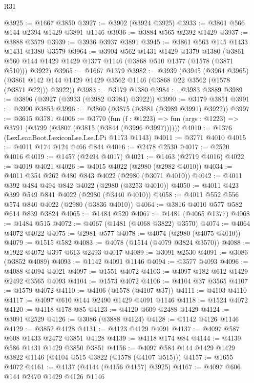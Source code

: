 \begin{lexlean}{R31}
\begin{coremodule}
@3925 := @1667 @3850
@3927 := @3902 (@3924 @3925)
@3933 := @3861 @566 @144 @2394 @1429 @3891 @1146
@3936 := @3884 @565 @2392 @1429
@3937 := @3888 @3579
@3939 := @3936 @3937 @3891
@3945 := @3861 @563 @145 @1433 @1431 @1380 @3579
@3964 := @3904
    @562
    @1431
    @1429
    @1379
    @1380
    (@3861 @560 @144 @1429 @1429 @1377 @1146 (@3868 @510 @1377 (@1578 (@3871 @510))) @3922)
@3965 := @1667 @1379
@3982 := @3939
    (@3945
      (@3964 @3965)
      (@3861 @142 @144 @1429 @1429 @3562 @1146 (@3868 @22 @3562 (@1578 (@3871 @22))) @3922))
@3983 := @3179 @1380
@3984 := @3983 @3889
@3989 := @3896 (@3927 (@3933 (@3982 @3984) @3922))
@3990 := @3179 @3851
@3991 := @3990 @3853
@3996 := @3860 (@3875 (@3881 (@3989 @3991) @3922))
@3997 := @3615 @3781
@4006 := @3770
    (fun (f : @1223) => fun (args : @1223) => @3791 (@3799 (@3807 (@3815 (@3844 (@3996 @3997))))))
@4010 := @1376 (LexLeanBoot.LexiconLse.Lse.LPi @1173 @1143)
@4011 := @3771 @4010
@4015 := @4011 @174 @124 @466 @844
@4016 := @2478 @2530
@4017 := @2520 @4016
@4019 := @1457 (@2494 @4017)
@4021 := @1463 (@2719 @4016)
@4022 := @4019 @4021
@4026 := @4015 @4022 (@2980 (@2982 @4010))
@4034 := @4011 @354 @262 @480 @843 @4022 (@2980 (@3071 @4010))
@4042 := @4011 @392 @484 @494 @842 @4022 (@2980 (@3253 @4010))
@4050 := @4011 @423 @399 @549 @841 @4022 (@2980 (@3440 @4010))
@4058 := @4011 @552 @556 @574 @840 @4022 (@2980 (@3836 @4010))
@4064 := @3816 @4010 @577 @582 @614 @839 @3824
@4065 := @1484 @520
@4067 := @1481 (@4065 @1377)
@4068 := @1484 @515
@4072 := @4067 (@1481 (@4068 @3822) @3570)
@4074 := @4064 @4072 @4022
@4075 := @2981 @577
@4078 := @4074 (@2980 (@4075 @4010))
@4079 := @1515 @582
@4083 := @4078 (@1514 (@4079 @3824 @3570))
@4088 := @1922 @4072 @397 @613 @2493 @4017
@4089 := @3091 @2530
@4091 := @3086 (@3852 @4089)
@4093 := @1142 @4091 @1146
@4094 := @3577 @4093
@4096 := @4088 @4094 @4021
@4097 := @1551 @4072
@4103 := @4097 @182 @612 @1429 @2492 @3565 @4093
@4104 := @1573 @4072
@4106 := @4104 @37 @3565
@4107 := @1579 @4072
@4110 := @4106 (@1578 (@4107 @37))
@4111 := @4103 @4110
@4117 := @4097 @610 @144 @2490 @1429 @4091 @1146
@4118 := @1524 @4072
@4120 := @4118 @178 @85
@4123 := @4120 @609 @2488 @1429
@4124 := @3091 @2529
@4126 := @3086 (@3888 @4124)
@4128 := @1142 @4126 @1146
@4129 := @3852 @4128
@4131 := @4123 @4129 @4091
@4137 := @4097 @587 @608 @1433 @2472 @3851 @4128
@4139 := @4118 @174 @84
@4144 := @4139 @586 @1431 @1429 @3850 @3851
@4156 := @4097 @584 @144 @1429 @1429 @3822 @1146 (@4104 @515 @3822 (@1578 (@4107 @515)))
@4157 := @1655 @4072
@4161 := @4137 (@4144 (@4156 @4157) @3925)
@4167 := @4097 @606 @144 @2470 @1429 @4126 @1146

\end{coremodule}
\end{lexlean}
